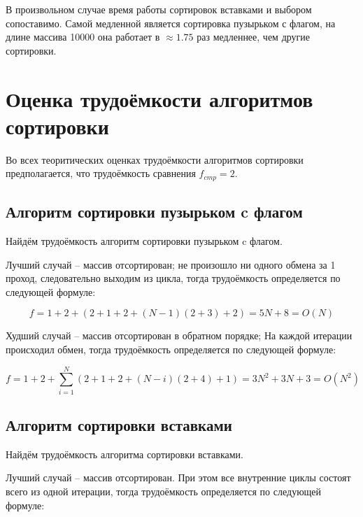         В произвольном случае время работы сортировок вставками и выбором сопоставимо.
        Самой медленной является сортировка пузырьком с флагом,
        на длине массива 10000 она работает в $ \approx 1.75 $ раз медленнее,
        чем другие сортировки.
        

    \section{Оценка трудоёмкости алгоритмов сортировки}
        Во всех теоритических оценках трудоёмкости
        алгоритмов сортировки предполагается, что
        трудоёмкость сравнения $ f_{cmp} = 2 $.

        \subsection{Алгоритм сортировки пузырьком c флагом}
            Найдём трудоёмкость алгоритм сортировки пузырьком c флагом.
            
            Лучший случай -- массив отсортирован; 
            не произошло ни одного обмена за 1 проход,
            следовательно выходим из цикла, тогда
            трудоёмкость определяется по следующей формуле:

            \begin{equation}
                f = 1 + 2 + (2 + 1 + 2 + (N - 1) (2 + 3) + 2) = 5N + 8= O(N)
            \end{equation}

            Худший случай -- массив отсортирован в обратном порядке; 
            На каждой итерации происходил обмен, тогда
            трудоёмкость определяется по следующей формуле:

            \begin{equation}
                f = 1 + 2 + \sum_{i=1}^N (2 + 1 + 2 + (N - i)(2 + 4) + 1) = 3N^2 + 3N + 3 = O(N^2)
            \end{equation}

        \subsection{Алгоритм сортировки вставками}
            Найдём трудоёмкость алгоритма сортировки вставками.
                
            Лучший случай -- массив отсортирован. 
            При этом все внутренние циклы состоят всего из одной итерации, тогда
            трудоёмкость определяется по следующей формуле:

